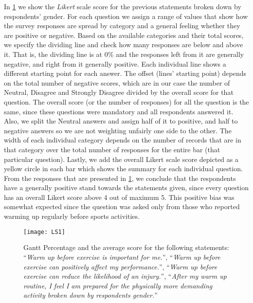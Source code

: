 In \ref{fig:LS1} we show the \textit{Likert} scale score for the previous statements broken down by respondents' gender. For each question we assign a range of values that show how the survey responses are spread by category and a general feeling whether they are positive or negative. Based on the available categories and their total scores, we specify the dividing line and check how many responses are below and above it. That is, the dividing line is at 0\% and the responses left from it are generally negative, and right from it generally positive.  Each individual line shows a different starting point for each answer. The offset (lines' starting point) depends on the total number of negative scores, which are in our case the number of Neutral, Disagree and Strongly Disagree divided by the overall score for that question. The overall score (or the number of responses) for all the question is the same, since these questions were mandatory and all respondents answered it. Also, we split the Neutral answers and assign half of it to positive, and half to negative answers so we are not weighting unfairly one side to the other.  The width of each individual category depends on the number of records that are in that category over the total number of responses for the entire bar (that particular question). Lastly, we add the overall Likert scale score depicted as a yellow circle in each bar which shows the summary for each individual question. From the responses that are presented in \ref{fig:LS1}, we conclude that the respondents have a generally positive stand towards the statements given, since every question has an overall Likert score above 4 out of maximum 5. This positive bias was somewhat expected since the question was asked only from those who reported warming up regularly before sports activities. \pagebreak
\begin{figure}[h]
    \centering
    \texttt{[image: LS1]}
    \caption{Gantt Percentage and the average score for the following statements: ``\textit{Warm up before exercise is important for me.}'', ``\textit{Warm up before exercise can positively affect my performance.}'', ``\textit{Warm up before exercise can reduce the likelihood of an injury.}'', ``\textit{After my warm up routine, I feel I am prepared for the physically more demanding activity broken down by respondents gender.}''}
    \label{fig:LS1}
\end{figure}\\
